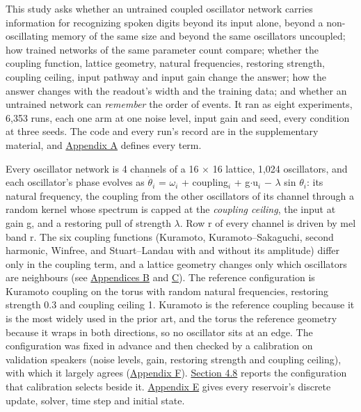 \documentclass{article}
\begin{document}
This study asks whether an untrained coupled oscillator network carries
information for recognizing spoken digits beyond its input alone, beyond
a non-oscillating memory of the same size and beyond the same
oscillators uncoupled; how trained networks of the same parameter count
compare; whether the coupling function, lattice geometry, natural
frequencies, restoring strength, coupling ceiling, input pathway and
input gain change the answer; how the answer changes with the readout's
width and the training data; and whether an untrained network can
\emph{remember} the order of events. It ran as eight experiments, 6,353
runs, each one arm at one noise level, input gain and seed, every
condition at three seeds. The code and every run's record are in the
supplementary material, and \hyperref[sec-A]{Appendix A} defines every
term.

Every oscillator network is 4 channels of a 16 \ensuremath{\times} 16
lattice, 1,024 oscillators, and each oscillator's phase evolves as
\ensuremath{\dot{\theta}_{i}} = \ensuremath{\omega_{i}} +
coupling\ensuremath{_{i}} + g\ensuremath{\cdot}u\ensuremath{_{i}}
\ensuremath{-} \ensuremath{\lambda} sin \ensuremath{\theta_{i}}: its
natural frequency, the coupling from the other oscillators of its
channel through a random kernel whose spectrum is capped at the
\emph{coupling ceiling}, the input at gain g, and a restoring pull of
strength \ensuremath{\lambda}. Row r of every channel is driven by mel
band r. The six coupling functions (Kuramoto, Kuramoto--Sakaguchi,
second harmonic, Winfree, and Stuart--Landau with and without its
amplitude) differ only in the coupling term, and a lattice geometry
changes only which oscillators are neighbours (see
\hyperref[sec-B]{Appendices B} and \hyperref[sec-C]{C}). The reference
configuration is Kuramoto coupling on the torus with random natural
frequencies, restoring strength 0.3 and coupling ceiling 1. Kuramoto is
the reference coupling because it is the most widely used in the prior
art, and the torus the reference geometry because it wraps in both
directions, so no oscillator sits at an edge. The configuration was
fixed in advance and then checked by a calibration on validation
speakers (noise levels, gain, restoring strength and coupling ceiling),
with which it largely agrees (\hyperref[sec-F]{Appendix F}).
\hyperref[sec-4-8]{Section 4.8} reports the configuration that
calibration selects beside it. \hyperref[sec-E]{Appendix E} gives every
reservoir's discrete update, solver, time step and initial state.
\end{document}
